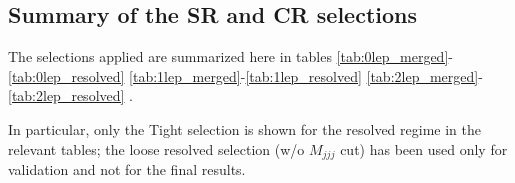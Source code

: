 \clearpage
\subsection{Summary of the SR and CR selections}
\label{subsec:summary_selection}

The selections applied are summarized here in tables 
\ref{tab:0lep_merged}-\ref{tab:0lep_resolved}
\ref{tab:1lep_merged}-\ref{tab:1lep_resolved}
\ref{tab:2lep_merged}-\ref{tab:2lep_resolved}
.

In particular, only the Tight selection is shown for the resolved regime in the relevant tables; 
the loose resolved selection (w/o $M_{jjj}$ cut) has been used only for validation and not for the final results.

\begin{table}[ht!]
\small
\caption{A summary of regions event selection for \zlep channel in the merged regime.}
\label{tab:0lep_merged}
\begin{center}
\end{center}
\end{table}
